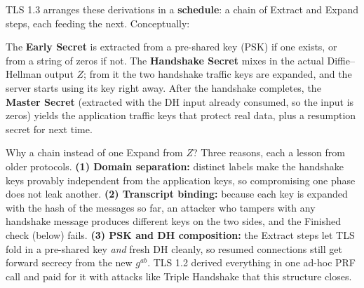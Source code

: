 TLS 1.3 arranges these derivations in a \textbf{schedule}: a chain of Extract and
Expand steps, each feeding the next. Conceptually:

\begin{center}
\end{center}

The \textbf{Early Secret} is extracted from a pre-shared key (PSK) if one exists,
or from a string of zeros if not. The \textbf{Handshake Secret} mixes in the actual
Diffie--Hellman output $Z$; from it the two handshake traffic keys are expanded,
and the server starts using its key right away. After the handshake completes, the
\textbf{Master Secret} (extracted with the DH input already consumed, so the input
is zeros) yields the application traffic keys that protect real data, plus a
resumption secret for next time.

\begin{whybox}
Why a chain instead of one Expand from $Z$? Three reasons, each a lesson from
older protocols. \textbf{(1) Domain separation:} distinct labels make the handshake
keys provably independent from the application keys, so compromising one phase
does not leak another. \textbf{(2) Transcript binding:} because each key is expanded
with the hash of the messages so far, an attacker who tampers with any handshake
message produces different keys on the two sides, and the Finished check (below)
fails. \textbf{(3) PSK and DH composition:} the Extract steps let TLS fold in a
pre-shared key \emph{and} fresh DH cleanly, so resumed connections still get forward
secrecy from the new $g^{ab}$. TLS 1.2 derived everything in one ad-hoc PRF call
and paid for it with attacks like Triple Handshake that this structure closes.
\end{whybox}

